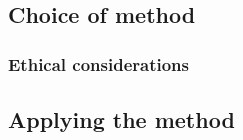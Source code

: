 \subsection{Choice of method}


    \subsubsection{Ethical considerations}
    
   
   
\subsection{Applying the method}

